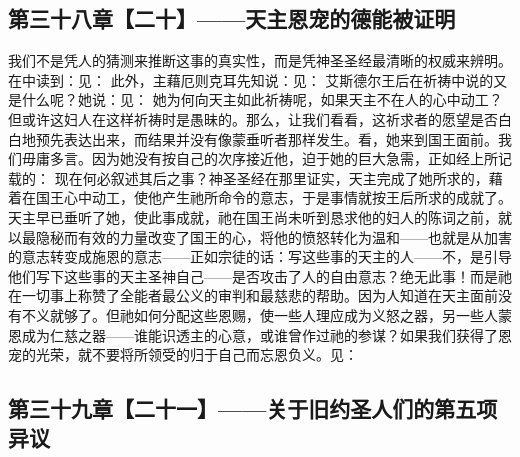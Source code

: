 \subsection{第三十八章【二十】——天主恩宠的德能被证明}

我们不是凭人的猜测来推断这事的真实性，而是凭神圣圣经最清晰的权威来辨明。在中读到：见： 此外，主藉厄则克耳先知说：见： 艾斯德尔王后在祈祷中说的又是什么呢？她说：见： 她为何向天主如此祈祷呢，如果天主不在人的心中动工？但或许这妇人在这样祈祷时是愚昧的。那么，让我们看看，这祈求者的愿望是否白白地预先表达出来，而结果并没有像蒙垂听者那样发生。看，她来到国王面前。我们毋庸多言。因为她没有按自己的次序接近他，迫于她的巨大急需，正如经上所记载的： 现在何必叙述其后之事？神圣圣经在那里证实，天主完成了她所求的，藉着在国王心中动工，使他产生祂所命令的意志，于是事情就按王后所求的成就了。天主早已垂听了她，使此事成就，祂在国王尚未听到恳求他的妇人的陈词之前，就以最隐秘而有效的力量改变了国王的心，将他的愤怒转化为温和——也就是从加害的意志转变成施恩的意志——正如宗徒的话：写这些事的天主的人——不，是引导他们写下这些事的天主圣神自己——是否攻击了人的自由意志？绝无此事！而是祂在一切事上称赞了全能者最公义的审判和最慈悲的帮助。因为人知道在天主面前没有不义就够了。但祂如何分配这些恩赐，使一些人理应成为义怒之器，另一些人蒙恩成为仁慈之器——谁能识透主的心意，或谁曾作过祂的参谋？如果我们获得了恩宠的光荣，就不要将所领受的归于自己而忘恩负义。见：\par


\subsection{第三十九章【二十一】——关于旧约圣人们的第五项异议}

